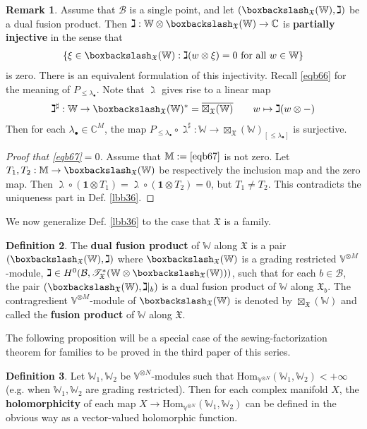 \documentclass[11pt,b5paper,notitlepage]{article}
\theoremstyle{definition}
\newtheorem{df}{Definition}[subsection]
\newtheorem{rem}[df]{Remark}
\theoremstyle{plain}
\newcommand{\ovl}{\overline}
\newcommand{\idt}{\mathbf{1}}
\newcommand{\Hom}{\mathrm{Hom}}
\newcommand{\scr}{\mathscr}
\newcommand{\blt}{\bullet}
\newcommand{\Vbb}{\mathbb V}
\newcommand{\Wbb}{\mathbb W}
\newcommand{\Mbb}{\mathbb M}
\newcommand{\Cbb}{\mathbb C}
\newcommand{\<}{\left\langle}
\renewcommand{\>}{\right\rangle}
\newcommand{\MB}{\mathcal{B}}
\newcommand{\fx}{\mathfrak{X}}
\newcommand{\bbs}{\boxbackslash}
\numberwithin{equation}{subsection}
\begin{document}
\begin{rem}\label{lbb55}
Assume that $\MB$ is a single point, and let $(\bbs_\fx(\Wbb),\gimel)$ be a dual fusion product. Then $\gimel:\Wbb\otimes\bbs_\fx(\Wbb)\rightarrow\Cbb$ is \textbf{partially injective} in the sense that
\begin{align}\label{eqb67}
\{\xi\in\bbs_\fx(\Wbb):\gimel(w\otimes\xi)=0\text{ for all }w\in\Wbb\}
\end{align}
is zero. There is an equivalent formulation of this injectivity. Recall \eqref{eqb66} for the meaning of $P_{\leq\lambda_\blt}$. Note that $\gimel$ gives rise to a linear map
\begin{align*}
\gimel^\sharp:\Wbb\rightarrow\bbs_\fx(\Wbb)^*=\ovl{\boxtimes_\fx(\Wbb)}\qquad w\mapsto \gimel(w\otimes-)
\end{align*}
Then for each $\lambda_\blt\in\Cbb^M$, the map $P_{\leq\lambda_\blt}\circ\gimel^\sharp:\Wbb\rightarrow \boxtimes_\fx(\Wbb)_{[\leq\lambda_\blt]}$ is surjective.
\end{rem}

\begin{proof}[Proof that \eqref{eqb67}$=0$]
Assume that $\Mbb:=\eqref{eqb67}$ is not zero. Let $T_1,T_2:\Mbb\rightarrow\bbs_\fx(\Wbb)$ be respectively the inclusion map and the zero map. Then $\gimel\circ(\idt\otimes T_1)=\gimel\circ(\idt\otimes T_2)=0$, but $T_1\neq T_2$. This contradicts the uniqueness part in Def. \ref{lbb36}.
\end{proof}



We now generalize Def. \ref{lbb36} to the case that $\fx$ is a family.

\begin{df}\label{lbb38}
The \textbf{dual fusion product} of $\Wbb$ along $\fx$ is a pair $(\bbs_\fx(\Wbb),\gimel)$ where $\bbs_\fx(\Wbb)$ is a grading restricted $\Vbb^{\otimes M}$-module, $\gimel\in H^0(\MB,\scr T^*_\fx(\Wbb\otimes\bbs_\fx(\Wbb)))$, such that for each $b\in\MB$, the pair $(\bbs_\fx(\Wbb),\gimel|_b)$ is a dual fusion product of $\Wbb$ along $\fx_b$. The contragredient $\Vbb^{\otimes M}$-module of $\bbs_\fx(\Wbb)$ is denoted by $\boxtimes_\fx(\Wbb)$ and called the \textbf{fusion product} of $\Wbb$ along $\fx$.
\end{df}


The following proposition will be a special case of the sewing-factorization theorem for families to be proved in the third paper of this series.


\begin{df}
Let $\Wbb_1,\Wbb_2$ be $\Vbb^{\otimes N}$-modules such that $\Hom_{\Vbb^{\otimes N}}(\Wbb_1,\Wbb_2)<+\infty$ (e.g. when $\Wbb_1,\Wbb_2$ are grading restricted). Then for each complex manifold $X$, the \textbf{holomorphicity} of each map $X\rightarrow \Hom_{\Vbb^{\otimes N}}(\Wbb_1,\Wbb_2)$ can be defined in the obvious way as a vector-valued holomorphic function. 
\end{df}
\end{document}
